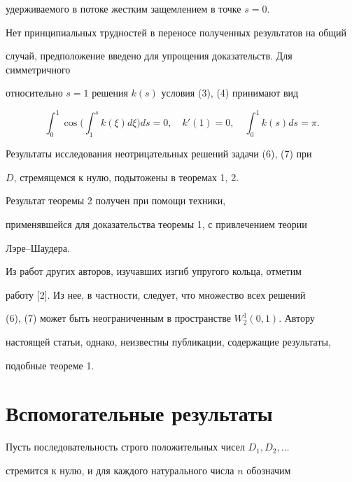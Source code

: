 удерживаемого в потоке жестким защемлением в точке $s=0$.


Нет принципиальных трудностей в переносе полученных результатов на общий


случай, предположение введено для упрощения доказательств. Для симметричного


относительно $s=1$ решения $k(s)$ условия (3), (4) принимают вид


\begin{equation}


\int_0^1 \cos \bigg(\int_1^s


k (\xi)d \xi \bigg) ds=0,\quad {k}'(1)=0,\quad


\int_0^1 k (s)ds=\pi.


\end{equation}





Результаты исследования неотрицательных решений задачи (6), (7) при


$D$, стремящемся к нулю, подытожены в теоремах 1, 2.


Результат теоремы 2 получен при помощи техники,


применявшейся для доказательства теоремы 1, с привлечением теории


Лэре--Шаудера.





Из работ других авторов, изучавших изгиб упругого кольца, отметим


работу [2]. Из нее, в частности, следует, что множество всех решений


(6), (7) может быть неограниченным в пространстве $W^1_2 (0,1)$. Автору


настоящей статьи, однако, неизвестны публикации, содержащие результаты,


подобные теореме 1.





\section{Вспомогательные результаты}





Пусть последовательность строго положительных чисел $D_1, D_2, \dotsc$


стремится к нулю, и для каждого натурального числа $n$ обозначим



